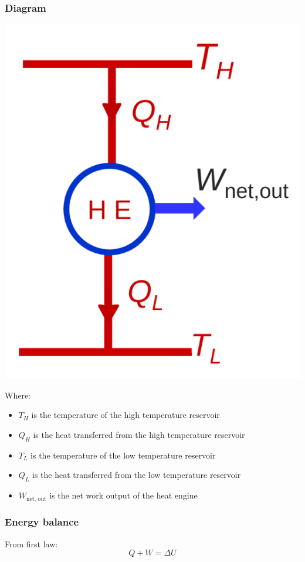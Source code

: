 \documentclass[11pt]{article}
\begin{document}
\subsubsection{Diagram}
\label{sec:orgd51e25e}
\begin{center}
\includegraphics[width=.9\linewidth]{./images/heat-engine-diagram.png}
\end{center}

Where:
\begin{itemize}
\item \(T_H\) is the temperature of the high temperature reservoir
\item \(Q_H\) is the heat transferred from the high temperature reservoir
\item \(T_L\) is the temperature of the low temperature reservoir
\item \(Q_L\) is the heat transferred from the low temperature reservoir
\item \(W_{\text{net, out}}\) is the net work output of the heat engine
\end{itemize}
\subsubsection{Energy balance}
\label{sec:org44aeccd}
From first law:
\[Q + W = \Delta U\]
\end{document}
